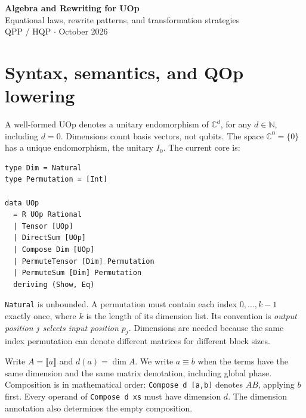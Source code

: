 \documentclass[11pt,a4paper]{article}
\newcommand{\C}{\mathbb C}
\newcommand{\N}{\mathbb N}
\newcommand{\sem}[1]{\llbracket #1\rrbracket}
\newcommand{\code}[1]{\texttt{#1}}
\begin{document}
\begin{center}
{\LARGE\bfseries Algebra and Rewriting for UOp}\\[8pt]
{\large Equational laws, rewrite patterns, and transformation strategies}\\[7pt]
{\small QPP / HQP \quad$\cdot$ October 2026}
\end{center}

\begin{abstract}
\noindent Flattened operand lists expose algebraic rewrites as maps,
guarded zips, identity-padded transposes, adjacent-pair scans, and list
splits. This note derives their exact, phase-preserving identities and
gives a small Haskell implementation. Permutations account for basis
order; strategies choose rule direction, traversal, and growth limits.
A QFT example shows how lifting compositions produces parallel layers
while increasing the number of identity nodes. All transformations
operate symbolically.
\end{abstract}

\section{Syntax, semantics, and QOp lowering}

A well-formed UOp denotes a unitary endomorphism of $\C^d$, for any $d\in\N$,
including $d=0$. Dimensions count basis vectors, not qubits. The space
$\C^0=\{0\}$ has a unique endomorphism, the unitary $I_0$.
The current core is:

\begin{lstlisting}
type Dim = Natural
type Permutation = [Int]

data UOp
  = R UOp Rational
  | Tensor [UOp]
  | DirectSum [UOp]
  | Compose Dim [UOp]
  | PermuteTensor [Dim] Permutation
  | PermuteSum [Dim] Permutation
  deriving (Show, Eq)
\end{lstlisting}

\code{Natural} is unbounded. A permutation must contain each index
$0,\ldots,k-1$ exactly once, where $k$ is the length of its dimension
list. Its convention is \emph{output position $j$ selects input position
$p_j$}. Dimensions are needed because the same index permutation can
denote different matrices for different block sizes.

Write $A=\sem a$ and $d(a)=\dim A$. We write $a\equiv b$ when the
terms have the same dimension and the same matrix denotation, including
global phase. Composition is in mathematical order:
\code{Compose d [a,b]} denotes $AB$, applying $b$ first.
Every operand of \code{Compose d xs} must have dimension $d$.
The dimension annotation also determines the empty composition.
\end{document}
